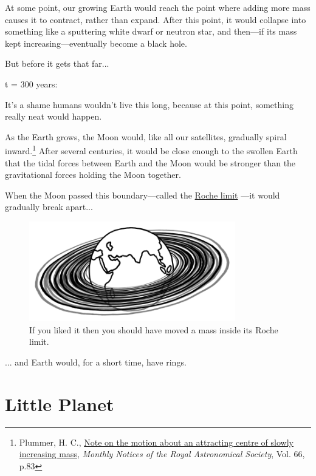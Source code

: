 {{At some point, our growing Earth would reach the point where adding more mass causes it to contract, rather than expand. After this point, it would collapse into something like a sputtering white dwarf or neutron star, and then—if its mass kept increasing—eventually become a black hole.}

{But before it gets that far...}

{t = 300 years:}

{It's a shame humans wouldn't live this long, because at this point, something really neat would happen.}

{As the Earth grows, the Moon would, like all our satellites, gradually spiral inward.{\footnote{Plummer, H. C., \href{http://adsabs.harvard.edu/full/1906MNRAS..66...83P}{Note on the motion about an attracting centre of slowly increasing mass}, \emph{Monthly Notices of the Royal Astronomical Society}, Vol. 66, p.83} } After several centuries, it would be close enough to the swollen Earth that the tidal forces between Earth and the Moon would be stronger than the gravitational forces holding the Moon together.}

{When the Moon passed this boundary—called the \href{https://en.wikipedia.org/wiki/Roche\_limit}{Roche limit} —it would gradually break apart...}

\begin{figure}[!htbp]
\centering
\includegraphics[scale=0.5, max width=0.8\textwidth]{imgs/a/67/expanding_rings.png}
\caption{If you liked it then you should have moved a mass inside its Roche limit.}
\end{figure}

{... and Earth would, for a short time, have rings.}

{
\chapter{Little Planet}
}

}
